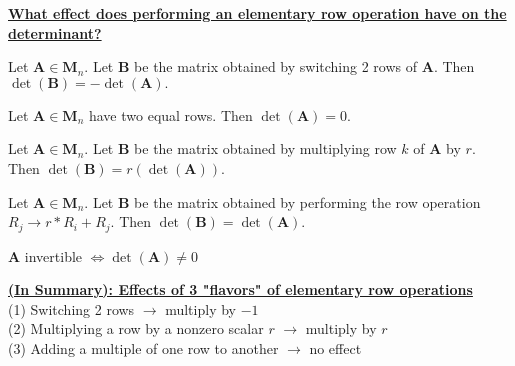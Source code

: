 \documentclass{article}
\begin{document}
\underline{\textbf{What effect does performing an elementary row operation have on the determinant?}}
\begin{theorem}
Let $\boldsymbol{A} \in \boldsymbol{M}_n.$ Let $\boldsymbol{B}$ be the matrix obtained by switching 2 rows of $\boldsymbol{A}.$ Then $\det(\boldsymbol{B}) = -\det(\boldsymbol{A}).$
\end{theorem}

\begin{corollary}
Let $\boldsymbol{A} \in \boldsymbol{M}_n$ have two equal rows. Then $\det(\boldsymbol{A}) = 0.$
\end{corollary}

\begin{theorem}
Let $\boldsymbol{A} \in \boldsymbol{M}_n.$ Let $\boldsymbol{B}$ be the matrix obtained by multiplying row $k$ of $\boldsymbol{A}$ by $r$. Then $\det(\boldsymbol{B}) = r(\det(\boldsymbol{A})).$
\end{theorem}

\begin{theorem}
Let $\boldsymbol{A} \in \boldsymbol{M}_n.$ Let $\boldsymbol{B}$ be the matrix obtained by performing the row operation $R_j \rightarrow r*R_i + R_j.$ Then $\det(\boldsymbol{B}) = \det(\boldsymbol{A}).$
\end{theorem}

\begin{theorem}
$\boldsymbol{A}$ invertible $\iff \det(\boldsymbol{A}) \neq 0$
\end{theorem}

\textbf{\underline{(In Summary): Effects of 3 "flavors" of elementary row operations}} \\
(1) Switching 2 rows $\rightarrow$ multiply by $-1$ \\
(2) Multiplying a row by a nonzero scalar $r$ $\rightarrow$ multiply by $r$ \\
(3) Adding a multiple of one row to another $\rightarrow$ no effect \\ \\ \\
\end{document}
